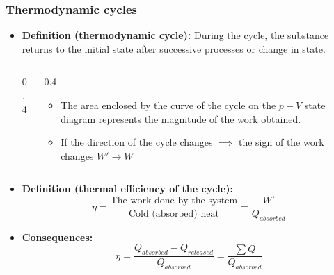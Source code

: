 \documentclass[t,aspectratio=169]{beamer}
\begin{document}
\begin{frame}
\frametitle{Thermodynamic cycles}
\begin{itemize}
\item  \textbf{Definition (thermodynamic cycle):} During the cycle, the substance returns to the initial state after successive processes or change in state.
\begin{columns}
\begin{column}{0.4\textwidth}
  \vfill
\begin{center}
\end{center}
\end{column}
\begin{column}{0.4\textwidth}
\begin{itemize}
\item The area enclosed by the curve of the cycle on the $p-V$ state diagram represents the magnitude of the work obtained.
\item If the direction of the cycle changes $\implies$ the sign of the work changes $W' \to W$
\end{itemize}
\end{column}
\end{columns}

\pagebreak
\item \textbf{Definition (thermal efficiency of the cycle):}
    $$\eta = \frac{\text{The work done by the system}}{\text{Cold (absorbed) heat}} = \frac{W'}{Q_{absorbed}}$$
\item \textbf{Consequences:}
  $$\eta = \frac{Q_{absorbed} - Q_{released}}{Q_{absorbed}} = \frac{\sum Q}{Q_{absorbed}}$$


\end{itemize}
\end{frame}
\end{document}
